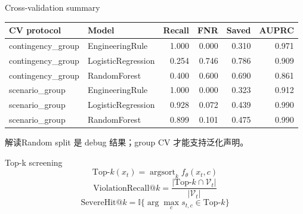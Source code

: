 \documentclass[aspectratio=169,11pt]{beamer}
\newcommand{\ind}{\mathbb{I}}
\begin{document}
\begin{frame}{Cross-validation summary}
\scriptsize\centering
\begin{tabular}{llrrrr}\toprule CV protocol & Model & Recall & FNR & Saved & AUPRC \\\midrule
contingency\_group & EngineeringRule & 1.000 & 0.000 & 0.310 & 0.971 \\
contingency\_group & LogisticRegression & 0.254 & 0.746 & 0.786 & 0.909 \\
contingency\_group & RandomForest & 0.400 & 0.600 & 0.690 & 0.861 \\
scenario\_group & EngineeringRule & 1.000 & 0.000 & 0.323 & 0.912 \\
scenario\_group & LogisticRegression & 0.928 & 0.072 & 0.439 & 0.990 \\
scenario\_group & RandomForest & 0.899 & 0.101 & 0.475 & 0.990 \\
\bottomrule\end{tabular}
\vspace{0.25cm}\begin{block}{解读}Random split 是 debug 结果；group CV 才能支持泛化声明。\end{block}
\end{frame}

\begin{frame}{Top-k screening}
\[\text{Top-}k(x_t)=\operatorname{argsort}_k f_\theta(x_t,c)\]
\[\text{ViolationRecall@}k=\frac{|\text{Top-}k\cap\mathcal{V}_t|}{|\mathcal{V}_t|}\]
\[\text{SevereHit@}k=\ind\{\arg\max_c s_{t,c}\in\text{Top-}k\}\]
\end{frame}
\end{document}
